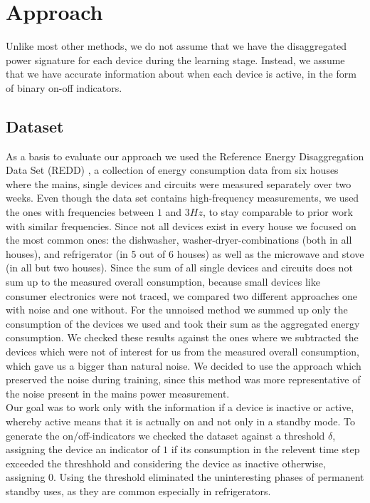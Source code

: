 \documentclass{article}
\begin{document}
\section{Approach}


Unlike most other methods, we do not assume that we have the disaggregated power signature for each device during the learning stage.
Instead, we assume that we have accurate information about when each device is active, in the form of binary on-off indicators.

\subsection{Dataset}
As a basis to evaluate our approach we used the Reference Energy Disaggregation Data Set (REDD) \cite{Redd}, a collection of energy consumption data from six houses where the mains, single devices and circuits were measured separately over two weeks.
Even though the data set contains high-frequency measurements, we used the ones with frequencies between $1$ and $3 Hz$, to stay comparable to prior work with similar frequencies.
Since not all devices exist in every house we focused on the most common ones: the dishwasher, washer-dryer-combinations (both in all houses), and refrigerator (in 5 out of 6 houses) as well as the microwave and stove (in all but two houses).
Since the sum of all single devices and circuits does not sum up to the measured overall consumption, because small devices like consumer electronics were not traced, we compared two different approaches one with noise and one without.
For the unnoised method we summed up only the consumption of the devices we used and took their sum as the aggregated energy consumption.
We checked these results against the ones where we subtracted the devices which were not of interest for us from the measured overall consumption, which gave us a bigger than natural noise.
We decided to use the approach which preserved the noise during training, since this method was more representative of the noise present in the mains power measurement.\\
Our goal was to work only with the information if a device is inactive or active, whereby active means that it is actually on and not only in a standby mode.
To generate the on/off-indicators we checked the dataset against a threshold $\delta$, assigning the device an indicator of $1$ if its consumption in the relevent time step exceeded the threshhold and considering the device as inactive otherwise, assigning $0$.
Using the threshold eliminated the uninteresting phases of permanent standby uses, as they are common especially in refrigerators.
\end{document}
